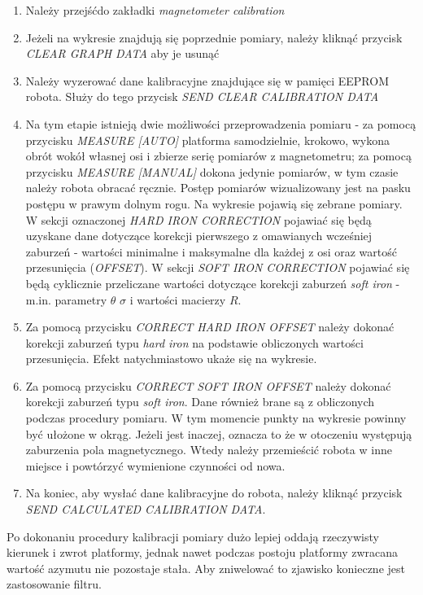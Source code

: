 \begin{enumerate}
    \item Należy przejśćdo zakładki \emph{magnetometer calibration}
    \item Jeżeli na wykresie znajdują się poprzednie pomiary, należy kliknąć przycisk \emph{CLEAR GRAPH DATA} aby je usunąć
    \item Należy wyzerować dane kalibracyjne znajdujące się w pamięci EEPROM robota. Służy do tego przycisk \emph{SEND CLEAR CALIBRATION DATA}
    \item Na tym etapie istnieją dwie możliwości przeprowadzenia pomiaru - za pomocą przycisku \emph{MEASURE [AUTO]} platforma samodzielnie, krokowo, wykona obrót wokół własnej osi i zbierze serię pomiarów z magnetometru; za pomocą przycisku \emph{MEASURE [MANUAL]} dokona jedynie pomiarów, w tym czasie należy robota obracać ręcznie. Postęp pomiarów wizualizowany jest na pasku postępu w prawym dolnym rogu. Na wykresie pojawią się zebrane pomiary. W sekcji oznaczonej \emph{HARD IRON CORRECTION} pojawiać się będą uzyskane dane dotyczące korekcji pierwszego z omawianych wcześniej zaburzeń - wartości minimalne i maksymalne dla każdej z osi oraz wartość przesunięcia (\emph{OFFSET}). W sekcji \emph{SOFT IRON CORRECTION} pojawiać się będą cyklicznie przeliczane wartości dotyczące korekcji zaburzeń \emph{soft iron} - m.in. parametry $\theta$ $\sigma$ i wartości macierzy $R$.
    \item Za pomocą przycisku \emph{CORRECT HARD IRON OFFSET} należy dokonać korekcji zaburzeń typu \emph{hard iron} na podstawie obliczonych wartości przesunięcia. Efekt natychmiastowo ukaże się na wykresie.
    \item Za pomocą przycisku \emph{CORRECT SOFT IRON OFFSET} należy dokonać korekcji zaburzeń typu \emph{soft iron}. Dane również brane są z obliczonych podczas procedury pomiaru. W tym momencie punkty na wykresie powinny być ułożone w okrąg. Jeżeli jest inaczej, oznacza to że w otoczeniu występują zaburzenia pola magnetycznego. Wtedy należy przemieścić robota w inne miejsce i powtórzyć wymienione czynności od nowa.
    \item Na koniec, aby wysłać dane kalibracyjne do robota, należy kliknąć przycisk \emph{SEND CALCULATED CALIBRATION DATA}. 
\end{enumerate}

Po dokonaniu procedury kalibracji pomiary dużo lepiej oddają rzeczywisty kierunek i zwrot platformy, jednak nawet podczas postoju platformy zwracana wartość azymutu nie pozostaje stała. Aby zniwelować to zjawisko konieczne jest zastosowanie filtru.

